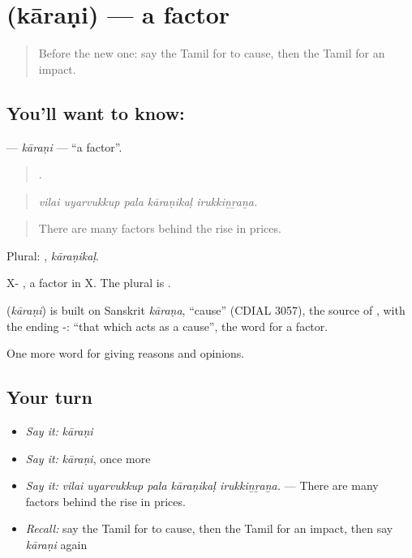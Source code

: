 \section[\texorpdfstring{\ta{காரணி} (kāraṇi)}{காரணி (kāraṇi)}]{ (kāraṇi) — a factor}

\label{lesson:TA-C352-karani}



\begin{quote}
Before the new one: say the Tamil for to cause, then the Tamil for an impact.
\end{quote}

\subsection*{You'll want to know: }
\textbf{} — \emph{kāraṇi} — \textquotedblleft{}a factor\textquotedblright{}.

\begin{quote}
    .
\end{quote}

\begin{quote}
\emph{vilai uyarvukkup pala kāraṇikaḷ irukkiṉṟaṉa.}
\end{quote}

\begin{quote}
There are many factors behind the rise in prices.
\end{quote}

Plural: , \emph{kāraṇikaḷ}.

X- , a factor in X. The plural is .

\begin{cousinweb}
\textbf{} (\emph{kāraṇi}) is built on Sanskrit \emph{kāraṇa}, \textquotedblleft{}cause\textquotedblright{} (CDIAL 3057), the source of , with the ending -: \textquotedblleft{}that which acts as a cause\textquotedblright{}, the word for a factor.
\end{cousinweb}

\begin{grammarlens}[title={What you've built}]
One more word for giving reasons and opinions.
\end{grammarlens}

\subsection*{Your turn}
\begin{itemize}
\raggedright
  \item \emph{Say it:} \emph{kāraṇi}
  \item \emph{Say it:} \emph{kāraṇi}, once more
  \item \emph{Say it:} \emph{vilai uyarvukkup pala kāraṇikaḷ irukkiṉṟaṉa.} — There are many factors behind the rise in prices.
  \item \emph{Recall:} say the Tamil for to cause, then the Tamil for an impact, then say \emph{kāraṇi} again
\end{itemize}

